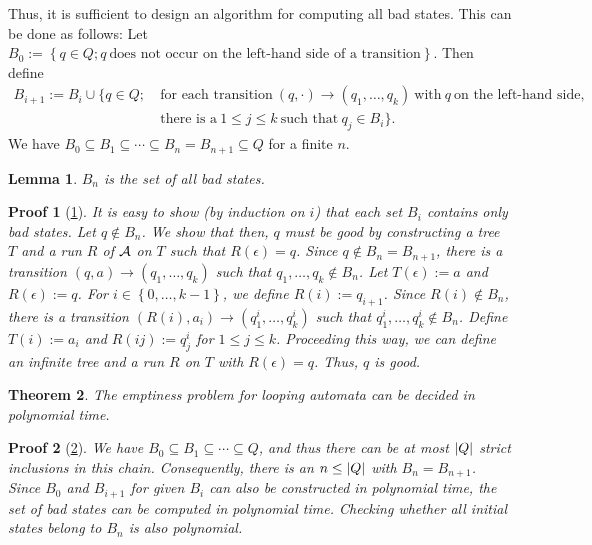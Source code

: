 \documentclass[openany]{scrbook}
\theoremstyle{break}
\newtheorem{Theorem}{Theorem}[chapter]
\newtheorem{Lemma}[Theorem]{Lemma}
\theoremstyle{nonumberbreak}
\theoremstyle{nonumberplain}
\theoremstyle{nonumberbreak}
\newtheorem{Proof}{Proof}
\newcommand{\then}{\Longrightarrow}
\newcommand{\abs}[2][]{\left|{#2}\right|\ifx#1\then\else_{#1}\fi}
\newcommand{\set}[1]{\left\{#1\right\}}
\begin{document}
Thus, it is sufficient to design an algorithm for computing all bad
states. This can be done as follows:
Let $B_0 := \set{q \in Q; q\ \text{does not occur on the left-hand
    side of a transition}}$. Then define
\begin{align*}
  B_{i + 1} := B_i \cup \big\{q \in Q;\ &\text{for each transition}\
    (q, \cdot) \to (q_1, \dotsc, q_k)\ \text{with}\ q\ \text{on the
      left-hand side,} \\ &\text{there is a}\ 1 \leq j \leq k\
    \text{such that}\ q_j \in B_i\big\}.
\end{align*}
We have $B_0 \subseteq B_1 \subseteq \dotsb \subseteq B_n = B_{n + 1}
\subseteq Q$ for a finite $n$.

\begin{Lemma}
  \label{5.6}
  $B_n$ is the set of all bad states.
\end{Lemma}

\begin{Proof}[\cref{5.6}]
  It is easy to show (by induction on $i$) that each set $B_i$
  contains only bad states. Let $q \not\in B_n$. We show that then,
  $q$ must be good by constructing a tree $T$ and a run $R$ of ${\cal A}$
  on $T$ such that $R(\epsilon) = q$. Since $q \not\in B_n = B_{n +
    1}$, there is a transition $(q, a) \to (q_1, \dotsc, q_k)$ such
  that $q_1, \dotsc, q_k \not\in B_n$. Let $T(\epsilon) := a$ and
  $R(\epsilon) := q$. For $i \in \set{0, \dotsc, k - 1}$, we define
  $R(i) := q_{i + 1}$. Since $R(i) \not\in B_n$, there is a transition
  $(R(i), a_i) \to (q_1^i, \dotsc, q_k^i)$ such that $q_1^i, \dotsc,
  q_k^i \not\in B_n$. Define $T(i) := a_i$ and $R(ij) := q_j^i$ for $1
  \leq j \leq k$. Proceeding this way, we can define an infinite tree
  and a run $R$ on $T$ with $R(\epsilon) = q$. Thus, $q$ is good.
\end{Proof}

\begin{Theorem}
  \label{5.7}
  The emptiness problem for looping automata can be decided in
  polynomial time.
\end{Theorem}

\begin{Proof}[\cref{5.7}]
  We have $B_0 \subseteq B_1 \subseteq \dotsb \subseteq Q$, and thus
  there can be at most $\abs{Q}$ strict inclusions in this
  chain. Consequently, there is an $n \leq \abs{Q}$ with $B_n = B_{n +
    1}$. Since $B_0$ and $B_{i + 1}$ for given $B_i$ can also be
  constructed in polynomial time, the set of bad states can be
  computed in polynomial time. Checking whether all initial states
  belong to $B_n$ is also polynomial.
\end{Proof}
\end{document}
